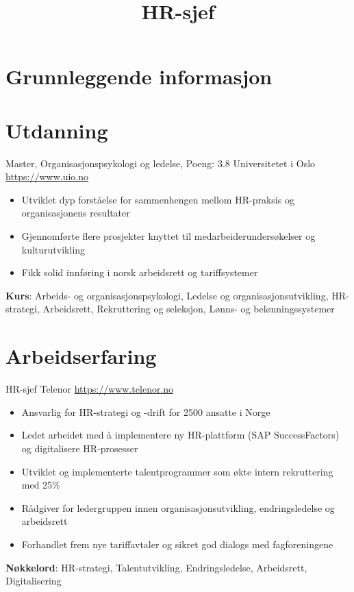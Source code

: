 \documentclass[a4paper, serif, 10pt]{moderncv}
\title{HR-sjef}
\begin{document}
\maketitle

\section{Grunnleggende informasjon}

\section{Utdanning}

        {Master, Organisasjonspsykologi og ledelse, Poeng: 3.8}
        {Universitetet i Oslo}
        {\url{https://www.uio.no}}
        {}
        {\begin{itemize}
\item Utviklet dyp forståelse for sammenhengen mellom HR-praksis og organisasjonens resultater
\item Gjennomførte flere prosjekter knyttet til medarbeiderundersøkelser og kulturutvikling
\item Fikk solid innføring i norsk arbeidsrett og tariffsystemer
\end{itemize}
\textbf{Kurs}: Arbeids- og organisasjonspsykologi, Ledelse og organisasjonsutvikling, HR-strategi, Arbeidsrett, Rekruttering og seleksjon, Lønns- og belønningssystemer}
\section{Arbeidserfaring}

        {HR-sjef}
        {Telenor}
        {\url{https://www.telenor.no}}
        {}
        {\begin{itemize}
\item Ansvarlig for HR-strategi og -drift for 2500 ansatte i Norge
\item Ledet arbeidet med å implementere ny HR-plattform (SAP SuccessFactors) og digitalisere HR-prosesser
\item Utviklet og implementerte talentprogrammer som økte intern rekruttering med 25\%
\item Rådgiver for ledergruppen innen organisasjonsutvikling, endringsledelse og arbeidsrett
\item Forhandlet frem nye tariffavtaler og sikret god dialogs med fagforeningene
\end{itemize}
\textbf{Nøkkelord}: HR-strategi, Talentutvikling, Endringsledelse, Arbeidsrett, Digitalisering}
\end{document}
